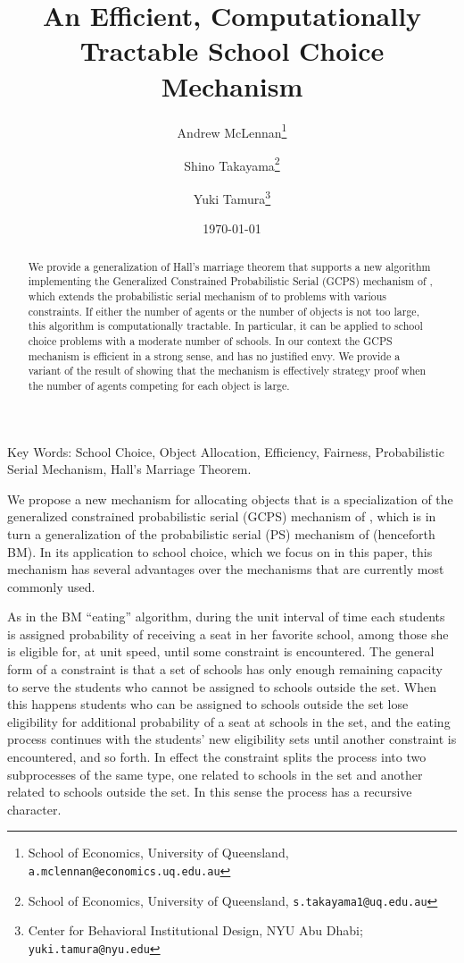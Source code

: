 \documentclass[12pt]{article}
\theoremstyle{definition}
\begin{document}
\title{An Efficient, Computationally Tractable School Choice Mechanism}

\author{Andrew McLennan\footnote{School of Economics, University of
    Queensland, {\tt a.mclennan@economics.uq.edu.au}} \and  Shino
Takayama\footnote{School of Economics, University of
  Queensland, {\tt s.takayama1@uq.edu.au}} \and Yuki Tamura\footnote{Center for Behavioral Institutional Design, NYU Abu Dhabi; {\tt yuki.tamura@nyu.edu}}}

\date{\today}

\maketitle

\begin{abstract}
We provide a generalization of Hall's marriage theorem that supports a new algorithm implementing the Generalized Constrained Probabilistic Serial (GCPS) mechanism of \cite{balbuzanov22jet}, which extends the probabilistic serial mechanism of \cite{bm01} to problems with various constraints. If either the number of agents or the number of objects is not too large, this algorithm is computationally tractable. In particular, it can be applied to school choice problems with a moderate number of schools.  In our context the GCPS mechanism is efficient in a strong sense, and has no justified envy.  We provide a variant of the result of \cite{km10jet} showing that the mechanism is effectively strategy proof when the number of agents competing for each object is large.
\end{abstract}

Key Words: School Choice, Object Allocation, Efficiency, Fairness, Probabilistic Serial Mechanism, Hall's Marriage Theorem.


\bigskip

We propose a new  mechanism for allocating objects that is a specialization of the generalized constrained probabilistic serial (GCPS) mechanism of \cite{balbuzanov22jet}, which is in turn a generalization of the probabilistic serial (PS) mechanism of \cite{bm01} (henceforth BM).   In its application to school choice, which we focus on in this paper, this mechanism has several advantages over the mechanisms that are currently most commonly used.  

As in the BM ``eating'' algorithm, during the unit interval of time each students is assigned probability of receiving a seat in her favorite school, among those she is eligible for, at unit speed, until some constraint is encountered.
The general form of a constraint is that  a set of schools has only enough remaining capacity to serve the students who cannot be assigned to schools outside the set.  When this happens students who can be assigned to schools outside the set lose eligibility for additional probability of a seat at schools in the set, and the eating process continues with the students' new eligibility sets until another constraint is encountered, and so forth. In effect the constraint splits the process into two subprocesses of the same type, one related to schools in the set and another related to schools outside the set.  In this sense the process has a recursive character.
\end{document}
